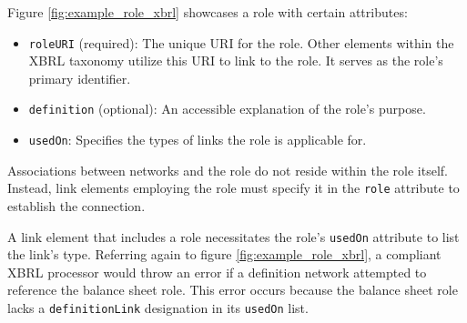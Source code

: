 Figure \ref{fig:example_role_xbrl} showcases a role with certain attributes:

\begin{itemize}
    \item \texttt{roleURI} (required): The unique URI for the role. Other elements within the XBRL taxonomy utilize this URI to link to the role. It serves as the role's primary identifier.
    \item \texttt{definition} (optional): An accessible explanation of the role's purpose.
    \item \texttt{usedOn}: Specifies the types of links the role is applicable for.
\end{itemize}

Associations between networks and the role do not reside within the role itself.
Instead, link elements employing the role must specify it in the \texttt{role} attribute to establish the connection.

A link element that includes a role necessitates the role's \texttt{usedOn} attribute to list the link's type.
Referring again to figure \ref{fig:example_role_xbrl}, 
a compliant XBRL processor would throw an error if a definition network attempted to reference the balance sheet role.
This error occurs because the balance sheet role lacks a \texttt{definitionLink} designation in its \texttt{usedOn} list.